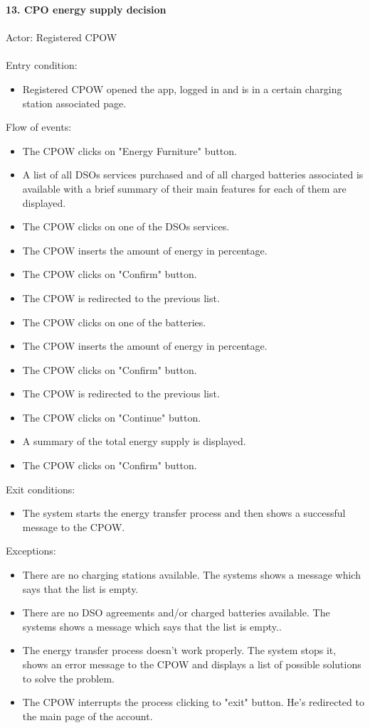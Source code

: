 \documentclass[a4paper]{report}
\begin{document}
\textbf{13. CPO energy supply decision}\label{uc:8}
\\ \\
Actor: Registered CPOW \\ \\
Entry condition:
\begin{itemize}
\item Registered CPOW opened the app, logged in and is in a certain charging station associated page.
\end{itemize}
Flow of events:
\begin{itemize}
\item The CPOW clicks on "Energy Furniture" button.
\item A list of all DSOs services purchased and of all charged batteries associated is available with a brief summary of their main features for each of them are displayed.
\item The CPOW clicks on one of the DSOs services.
\item The CPOW inserts the amount of energy in percentage.
\item The CPOW clicks on "Confirm" button.
\item The CPOW is redirected to the previous list.
\item The CPOW clicks on one of the batteries.
\item The CPOW inserts the amount of energy in percentage.
\item The CPOW clicks on "Confirm" button.
\item The CPOW is redirected to the previous list.
\item The CPOW clicks on "Continue" button.
\item A summary of the total energy supply is displayed.
\item The CPOW clicks on "Confirm" button.
\end{itemize}
Exit conditions:
\begin{itemize}
\item The system starts the energy transfer process and then shows a successful message to the CPOW.
\end{itemize}
Exceptions:
\begin{itemize}
\item There are no charging stations available. The systems shows a message which says that the list is empty.
\item There are no DSO agreements and/or charged batteries available. The systems shows a message which says that the list is empty..
\item The energy transfer process doesn't work properly. The system stops it, shows an error message to the CPOW and displays a list of possible solutions to solve the problem.
\item The CPOW interrupts the process clicking to "exit" button. He's redirected to the main page of the account.
\end{itemize}
\end{document}
